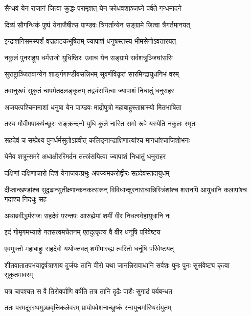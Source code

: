 \twolineshloka
{सैन्धवं येन राजानं जित्वा क्रुद्धः परामृशत्}
{येन क्रोधवशाञ्जघ्ने पर्वते गन्धमादने}


\twolineshloka
{दिव्यं सौगन्धिकं पुष्पं येनाजैषीत्स पाण्डवः}
{त्रिगर्तान्येन सङ्ग्रामे जित्वा त्रैगर्तमानयत्}


\twolineshloka
{इन्द्राशनिसमस्पर्शं वज्रहाटकभूषितम्}
{ज्यापाशं धनुषस्तस्य भीमसेनोऽवतारयत्}


\twolineshloka
{नकुलं पुनराहूय धर्मराजो युधिष्ठिरः}
{उवाच येन सङ्ग्रामे सर्वशत्रूञ्जिघांससि}


\twolineshloka
{सुराष्ट्राञ्जितवान्येन शार्ङ्गगाण्डीवसन्निभम्}
{सुवर्णविकृतं सारमिन्द्रायुधनिभं वरम्}


\twolineshloka
{तवानुरूपं सुकृतं चापमेतदलङ्कृतम्}
{तद्व्यंसयित्वा ज्यापाशं निधातुं धनुराहर}



\twolineshloka
{अजयत्पश्चिमामाशां धनुषा येन पाण्डवः}
{माद्रीपुत्रो महाबाहुस्ताम्रास्यो मितभाषिता}


\twolineshloka
{तस्य मौर्वीमपाकर्षच्छूरः सङ्क्रन्दनो युधि}
{कुले नास्ति समो रूपे यस्येति नकुलः स्मृतः}


\twolineshloka
{सहदेवं च सम्प्रेक्ष्य पुनर्धर्मसुतोऽब्रवीत्}
{कलिङ्गान्द्राक्षिणात्यांश्च मागधांश्चाजिशोभनः}


\twolineshloka
{येनैव शत्रून्समरे अधाक्षीररिमर्दन}
{तत्स्रंसयित्वा ज्यापाशं निधातुं धनुराहर}



\twolineshloka
{दक्षिणां दक्षिणाचारो दिशं येनाजयत्प्रभुः}
{अपज्यमकरोद्वीरः सहदेवस्तदायुधम्}


\threelineshloka
{दीप्तान्खण्डांश्च सुदृढान्सुतीक्ष्णान्कनकत्सरून्}
{विविधान्क्षुरनाराचान्निस्त्रिंशांश्च शरानपि}
{आयुधानि कलापांश्च गदाश्च निदधुः सह}


\twolineshloka
{अथाब्रवीद्धर्मराजः सहदेवं परन्तपः}
{आरुह्येमां शमीं वीर निधत्स्वेहायुधानि नः}


\twolineshloka
{इदं गोमृगमभ्याशे गतसत्वमचेतनम्}
{एतदुत्कृत्य वै वीर धनूंषि परिवेष्टय}


\twolineshloka
{एवमुक्तो महाबाहुः सहदेवो यथोक्तवत्}
{शमीमारुह्य त्वरितो धनूंषि परिवेष्टयत्}


\threelineshloka
{शीतवातातपभयाद्वर्षत्राणाय दुर्जयः}
{तानि वीरो यथा जानन्निरावाधानि सर्वशः}
{पुनः पुनः सुसंवेष्ट्य कृत्वा सुकृतमावरम्}


\twolineshloka
{यत्र चापश्यत स वै तिरोवर्पाणि वर्षति}
{तत्र तानि दृढैः पाशैः सुगाढं पर्यबन्धत}


\twolineshloka
{ततः परमदूरस्थमुञ्छवृत्तिकलेवरम्}
{प्रायोपवेशनाच्छुष्कं स्नायुचर्मास्थिसंयुतम्}


